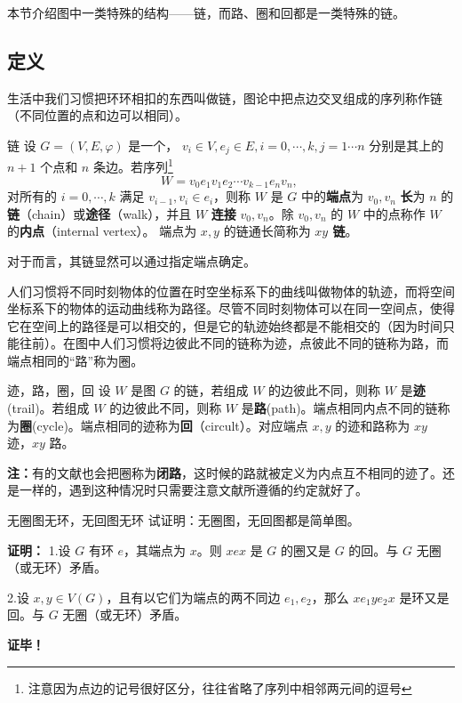 
本节介绍图中一类特殊的结构——链，而路、圈和回都是一类特殊的链。

\subsection{定义}
\cite{graph2}生活中我们习惯把环环相扣的东西叫做链，图论中把点边交叉组成的序列称作链（不同位置的点和边可以相同）。

\begin{definition}{链}
设 $G=(V,E,\varphi)$ 是一个， $v_i\in V,e_j\in E,i=0,\cdots,k,j=1\cdots n$ 分别是其上的 $n+1$ 个点和 $n$ 条边。若序列\footnote{注意因为点边的记号很好区分，往往省略了序列中相邻两元间的逗号}
\begin{equation}
W=v_0 e_1v_1e_2\cdots v_{k-1} e_nv_n,~
\end{equation}
对所有的 $i=0,\cdots,k$ 满足 $v_{i-1},v_{i}\in e_{i}$，则称 $W$ 是 $G$ 中的\textbf{端点}为 $v_0,v_n$ \textbf{长}为 $n$ 的\textbf{链}（chain）或\textbf{途径}（walk），并且 $W$ \textbf{连接} $v_0,v_n$。除 $v_0,v_n$ 的 $W$ 中的点称作 $W$ 的\textbf{内点}（internal vertex）。 端点为 $x,y$ 的链通长简称为 \textbf{$xy$ 链}。
\end{definition}
对于而言，其链显然可以通过指定端点确定。

人们习惯将不同时刻物体的位置在时空坐标系下的曲线叫做物体的轨迹，而将空间坐标系下的物体的运动曲线称为路径。尽管不同时刻物体可以在同一空间点，使得它在空间上的路径是可以相交的，但是它的轨迹始终都是不能相交的（因为时间只能往前）。在图中人们习惯将边彼此不同的链称为迹，点彼此不同的链称为路，而端点相同的“路”称为圈。
\begin{definition}{迹，路，圈，回}\label{def_PatCyc_2}
设 $W$ 是图 $G$ 的链，若组成 $W$ 的边彼此不同，则称 $W$ 是\textbf{迹}(trail)。若组成 $W$ 的边彼此不同，则称 $W$ 是\textbf{路}(path)。端点相同内点不同的链称为\textbf{圈}(cycle)。端点相同的迹称为\textbf{回}（circult）。对应端点 $x,y$ 的迹和路称为 $xy$ 迹，$xy$ 路。
\end{definition}
\textbf{注：}有的文献也会把圈称为\textbf{闭路}，这时候的路就被定义为内点互不相同的迹了。还是一样的，遇到这种情况时只需要注意文献所遵循的约定就好了。

\begin{example}{无圈图无环，无回图无环}\label{ex_PatCyc_1}
试证明：无圈图，无回图都是简单图。

\textbf{证明：}
1.设 $G$ 有环 $e$，其端点为 $x$。则 $xex$ 是 $G$ 的圈又是 $G$ 的回。与 $G$ 无圈（或无环）矛盾。

2.设 $x,y\in V(G)$，且有以它们为端点的两不同边 $e_1,e_2$，那么
$xe_1ye_2x$ 是环又是回。与 $G$ 无圈（或无环）矛盾。

\textbf{证毕！}
\end{example}


